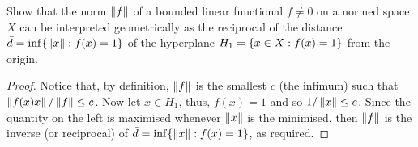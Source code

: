 \begin{exercise}{14}
Show that the norm $\left\lVert f\right\rVert$ of a bounded linear functional $f\neq 0$ on a normed space $X$ can be interpreted geometrically as the reciprocal of the distance $\bar{d}=\inf\{\left\lVert x\right\rVert: f(x)=1\}$ of the hyperplane $H_1=\{x\in X: f(x)=1\}$ from the origin.
\end{exercise}
\begin{proof}
Notice that, by definition, $\left\lVert f\right\rVert$ is the smallest $c$ (the infimum) such that $\left\lVert f(x)x\right\rVert/\left\lVert f\right\rVert\leq c$.
Now let $x\in H_1$, thus, $f(x)=1$ and so $1/\left\lVert x\right\rVert\leq c$.
Since the quantity on the left is maximised whenever $\left\lVert x\right\rVert$ is the minimised, then $\left\lVert f\right\rVert$ is the inverse (or reciprocal) of $\bar{d}=\inf\{\left\lVert x\right\rVert:f(x)=1\}$, as required.
\end{proof}